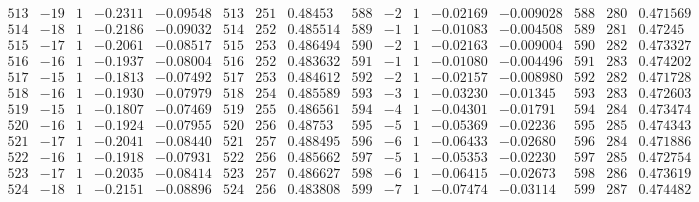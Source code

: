 \documentclass[11pt,reqno,a4letter]{article}
\numberwithin{figure}{section}
\numberwithin{table}{section}
\theoremstyle{plain}
\numberwithin{theorem}{section}
\theoremstyle{definition}
\begin{document}
\begin{table}[ht]
\begin{equation*}
{\begin{array}{ccccc|ccc|ccccc|ccc}
 513 & -19 & 1 & -0.2311 & -0.09548 & 513 & 251 & 0.48453 & 588 & -2 & 1 & -0.02169 & -0.009028 & 588 & 280 & 0.471569 \\
 514 & -18 & 1 & -0.2186 & -0.09032 & 514 & 252 & 0.485514 & 589 & -1 & 1 & -0.01083 & -0.004508 & 589 & 281 & 0.47245 \\
 515 & -17 & 1 & -0.2061 & -0.08517 & 515 & 253 & 0.486494 & 590 & -2 & 1 & -0.02163 & -0.009004 & 590 & 282 & 0.473327 \\
 516 & -16 & 1 & -0.1937 & -0.08004 & 516 & 252 & 0.483632 & 591 & -1 & 1 & -0.01080 & -0.004496 & 591 & 283 & 0.474202 \\
 517 & -15 & 1 & -0.1813 & -0.07492 & 517 & 253 & 0.484612 & 592 & -2 & 1 & -0.02157 & -0.008980 & 592 & 282 & 0.471728 \\
 518 & -16 & 1 & -0.1930 & -0.07979 & 518 & 254 & 0.485589 & 593 & -3 & 1 & -0.03230 & -0.01345 & 593 & 283 & 0.472603 \\
 519 & -15 & 1 & -0.1807 & -0.07469 & 519 & 255 & 0.486561 & 594 & -4 & 1 & -0.04301 & -0.01791 & 594 & 284 & 0.473474 \\
 520 & -16 & 1 & -0.1924 & -0.07955 & 520 & 256 & 0.48753 & 595 & -5 & 1 & -0.05369 & -0.02236 & 595 & 285 & 0.474343 \\
 521 & -17 & 1 & -0.2041 & -0.08440 & 521 & 257 & 0.488495 & 596 & -6 & 1 & -0.06433 & -0.02680 & 596 & 284 & 0.471886 \\
 522 & -16 & 1 & -0.1918 & -0.07931 & 522 & 256 & 0.485662 & 597 & -5 & 1 & -0.05353 & -0.02230 & 597 & 285 & 0.472754 \\
 523 & -17 & 1 & -0.2035 & -0.08414 & 523 & 257 & 0.486627 & 598 & -6 & 1 & -0.06415 & -0.02673 & 598 & 286 & 0.473619 \\
 524 & -18 & 1 & -0.2151 & -0.08896 & 524 & 256 & 0.483808 & 599 & -7 & 1 & -0.07474 & -0.03114 & 599 & 287 & 0.474482 \\
\end{array} 
}
\end{equation*} 
\clearpage 

\end{table} 

\clearpage 
\end{document}
